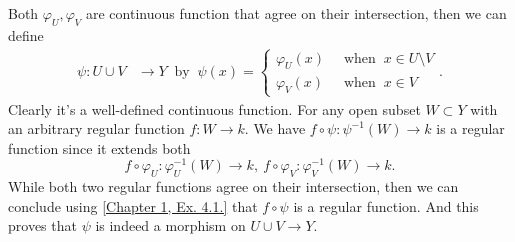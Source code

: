 Both $\varphi_U,\varphi_V$ are continuous function that agree on their intersection, then we can define 
\begin{align*}
    \psi:U\cup V &\to Y ~\text{ by }~ \psi(x)=\begin{cases}
        \varphi_U(x) & ~\text{ when }~ x\in U\setminus V\\
        \varphi_V(x) & ~\text{ when }~ x\in V 
    \end{cases}.
\end{align*}
Clearly it's a well-defined continuous function. For any open subset $W\subset Y$ with an arbitrary regular function $f:W\to k$. 
We have $f\circ \psi:\psi^{-1}(W)\to k$ is a regular function since it extends both 
\[f\circ \varphi_U:\varphi_U^{-1}(W)\to k,~ f\circ \varphi_V:\varphi_V^{-1}(W)\to k.\]
While both two regular functions agree on their intersection, then we can conclude using \ref{Chapter 1, Ex. 4.1.} that $f\circ\psi$ is a regular function. 
And this proves that $\psi$ is indeed a morphism on $U\cup V\to Y$.